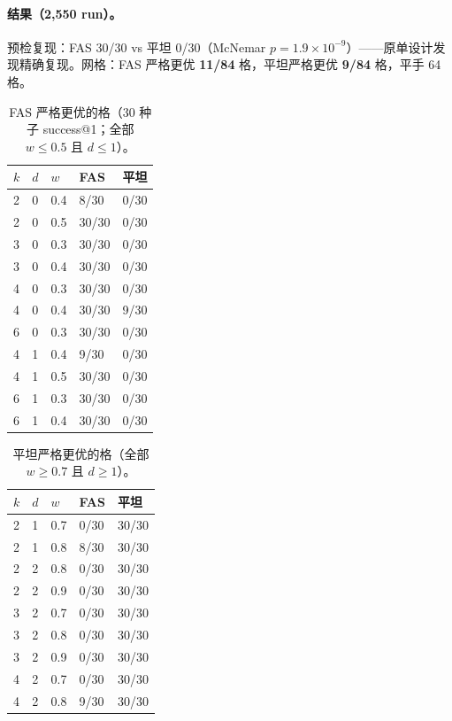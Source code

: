 \documentclass[10pt,a4paper]{ctexart}
\begin{document}
\paragraph{结果（2,550 run）。}预检复现：FAS 30/30 vs 平坦 0/30（McNemar $p{=}1.9\times10^{-9}$）——原单设计发现精确复现。网格：FAS 严格更优 \textbf{11/84} 格，平坦严格更优 \textbf{9/84} 格，平手 64 格。

\begin{table}[h]
\centering\small
\caption{FAS 严格更优的格（30 种子 success@1；全部 $w{\le}0.5$ 且 $d{\le}1$）。}
\label{tab:s-sweepwin}
\begin{tabular}{lllll}
\toprule
$k$ & $d$ & $w$ & FAS & 平坦 \\
\midrule
2 & 0 & 0.4 & 8/30 & 0/30 \\
2 & 0 & 0.5 & 30/30 & 0/30 \\
3 & 0 & 0.3 & 30/30 & 0/30 \\
3 & 0 & 0.4 & 30/30 & 0/30 \\
4 & 0 & 0.3 & 30/30 & 0/30 \\
4 & 0 & 0.4 & 30/30 & 9/30 \\
6 & 0 & 0.3 & 30/30 & 0/30 \\
4 & 1 & 0.4 & 9/30 & 0/30 \\
4 & 1 & 0.5 & 30/30 & 0/30 \\
6 & 1 & 0.3 & 30/30 & 0/30 \\
6 & 1 & 0.4 & 30/30 & 0/30 \\
\bottomrule
\end{tabular}
\end{table}

\begin{table}[h]
\centering\small
\caption{平坦严格更优的格（全部 $w{\ge}0.7$ 且 $d{\ge}1$）。}
\label{tab:s-sweeplose}
\begin{tabular}{lllll}
\toprule
$k$ & $d$ & $w$ & FAS & 平坦 \\
\midrule
2 & 1 & 0.7 & 0/30 & 30/30 \\
2 & 1 & 0.8 & 8/30 & 30/30 \\
2 & 2 & 0.8 & 0/30 & 30/30 \\
2 & 2 & 0.9 & 0/30 & 30/30 \\
3 & 2 & 0.7 & 0/30 & 30/30 \\
3 & 2 & 0.8 & 0/30 & 30/30 \\
3 & 2 & 0.9 & 0/30 & 30/30 \\
4 & 2 & 0.7 & 0/30 & 30/30 \\
4 & 2 & 0.8 & 9/30 & 30/30 \\
\bottomrule
\end{tabular}
\end{table}
\end{document}
